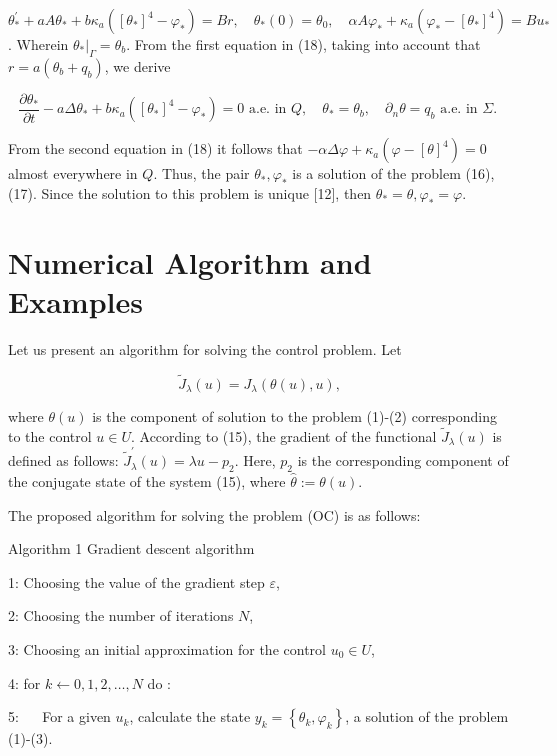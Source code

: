 \documentclass[10pt]{article}
\begin{document}
$\theta_{*}^{\prime}+a A \theta_{*}+b \kappa_{a}\left(\left[\theta_{*}\right]^{4}-\varphi_{*}\right)=B r, \quad \theta_{*}(0)=\theta_{0}, \quad \alpha A \varphi_{*}+\kappa_{a}\left(\varphi_{*}-\left[\theta_{*}\right]^{4}\right)=B u_{*}$. Wherein $\left.\theta_{*}\right|_{\Gamma}=\theta_{b}$. From the first equation in (18), taking into account that $r=a\left(\theta_{b}+q_{b}\right)$, we derive

$$
\frac{\partial \theta_{*}}{\partial t}-a \Delta \theta_{*}+b \kappa_{a}\left(\left[\theta_{*}\right]^{4}-\varphi_{*}\right)=0 \text { a.e. in } Q, \quad \theta_{*}=\theta_{b}, \quad \partial_{n} \theta=q_{b} \text { a.e. in } \Sigma \text {. }
$$

From the second equation in (18) it follows that $-\alpha \Delta \varphi+\kappa_{a}\left(\varphi-[\theta]^{4}\right)=0$ almost everywhere in $Q$. Thus, the pair $\theta_{*}, \varphi_{*}$ is a solution of the problem (16), (17). Since the solution to this problem is unique [12], then $\theta_{*}=\theta, \varphi_{*}=\varphi$.

\section{Numerical Algorithm and Examples}
Let us present an algorithm for solving the control problem. Let

$$
\widetilde{J}_{\lambda}(u)=J_{\lambda}(\theta(u), u),
$$

where $\theta(u)$ is the component of solution to the problem (1)-(2) corresponding to the control $u \in U$. According to (15), the gradient of the functional $\widetilde{J}_{\lambda}(u)$ is defined as follows: $\widetilde{J}_{\lambda}^{\prime}(u)=\lambda u-p_{2}$. Here, $p_{2}$ is the corresponding component of the conjugate state of the system (15), where $\widehat{\theta}:=\theta(u)$.

The proposed algorithm for solving the problem (OC) is as follows:

Algorithm 1 Gradient descent algorithm

1: Choosing the value of the gradient step $\varepsilon$,

2: Choosing the number of iterations $N$,

3: Choosing an initial approximation for the control $u_{0} \in U$,

4: for $k \leftarrow 0,1,2, \ldots, N$ do :

5: $\quad$ For a given $u_{k}$, calculate the state $y_{k}=\left\{\theta_{k}, \varphi_{k}\right\}$, a solution of the problem (1)-(3).
\end{document}
